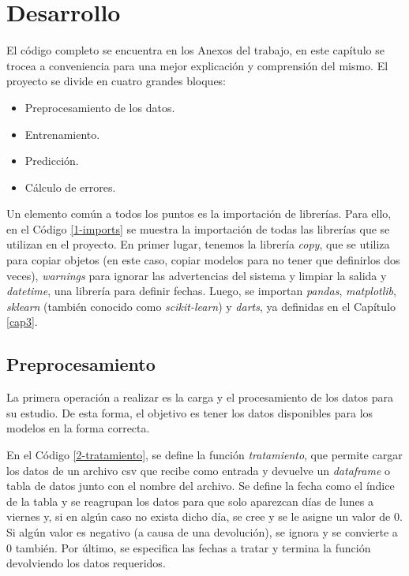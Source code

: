 \chapter{Desarrollo}\label{cap4}

El código completo se encuentra en los Anexos del trabajo, en este capítulo se trocea a conveniencia para una mejor explicación y comprensión del mismo. El proyecto se divide en cuatro grandes bloques:

\begin{itemize}
    \item Preprocesamiento de los datos.
    \item Entrenamiento.
    \item Predicción.
    \item Cálculo de errores.
\end{itemize}

Un elemento común a todos los puntos es la importación de librerías. Para ello, en el Código \ref*{1-imports} se muestra la importación de todas las librerías que se utilizan en el proyecto. En primer lugar, tenemos la librería \textit{copy}, que se utiliza para copiar objetos (en este caso, copiar modelos para no tener que definirlos dos veces), \textit{warnings} para ignorar las advertencias del sistema y limpiar la salida y \textit{datetime}, una librería para definir fechas. Luego, se importan \textit{pandas}, \textit{matplotlib}, \textit{sklearn} (también conocido como \textit{scikit-learn}) y \textit{darts}, ya definidas en el Capítulo \ref{cap3}.



\section{Preprocesamiento}\label{cap4-preproc}

La primera operación a realizar es la carga y el procesamiento de los datos para su estudio. De esta forma, el objetivo es tener los datos disponibles para los modelos en la forma correcta.

En el Código \ref*{2-tratamiento}, se define la función \textit{tratamiento}, que permite cargar los datos de un archivo csv que recibe como entrada y devuelve un \textit{dataframe} o tabla de datos junto con el nombre del archivo. Se define la fecha como el índice de la tabla y se reagrupan los datos para que solo aparezcan días de lunes a viernes y, si en algún caso no exista dicho día, se cree y se le asigne un valor de 0. Si algún valor es negativo (a causa de una devolución), se ignora y se convierte a 0 también. Por último, se especifica las fechas a tratar y termina la función devolviendo los datos requeridos.

